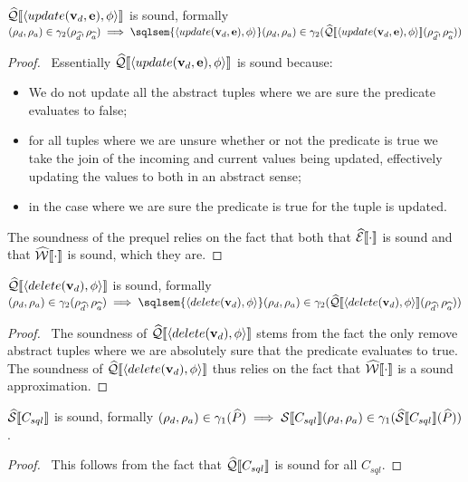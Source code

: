 \begin{conjecture}\label{thm:sound-update}
    $\widehat{\mathcal{Q}}\llbracket \langle update(\mathbf{v}_d, \mathbf{e}), \phi \rangle \rrbracket$ is sound, formally $(\rho_d, \rho_a) \in \concrete_2(\rho_{\ab{d}}, \rho_{\ab{a}}) \implies \sqlsem{\langle update(\absattrs, \absexps), \abspred \rangle}(\rho_d, \rho_a) \in \concrete_2(\abssqlsem{\langle update(\absattrs, \absexps), \abspred \rangle}(\rho_{\ab{d}}, \rho_{\ab{a}}))$
\end{conjecture}
\begin{proof}
    \pfsketch\
    Essentially $\widehat{\mathcal{Q}}\llbracket \langle update(\mathbf{v}_d, \mathbf{e}), \phi \rangle \rrbracket$ is sound because:
    \begin{itemize}
        \item We do not update all the abstract tuples where we are sure the predicate evaluates to false;
        \item for all tuples where we are unsure whether or not the predicate is true we take the join of the incoming and current values being updated, effectively updating the values to both in an abstract sense;
        \item in the case where we are sure the predicate is true for the tuple is updated.
    \end{itemize}
    The soundness of the prequel relies on the fact that both that $\widehat{\mathcal{E}}\llbracket \cdot \rrbracket$ is sound and that $\widehat{\mathcal{W}}\llbracket \cdot \rrbracket$ is sound, which they are.
\end{proof}

\begin{conjecture}\label{thm:sound-update}
    $\widehat{\mathcal{Q}}\llbracket \langle delete(\mathbf{v}_d), \phi \rangle \rrbracket$ is sound, formally $(\rho_d, \rho_a) \in \concrete_2(\rho_{\ab{d}}, \rho_{\ab{a}}) \implies \sqlsem{\langle delete(\absattrs), \abspred \rangle}(\rho_d, \rho_a) \in \concrete_2(\abssqlsem{\langle delete(\absattrs), \abspred \rangle}(\rho_{\ab{d}}, \rho_{\ab{a}}))$
\end{conjecture}
\begin{proof}
    \pfsketch\
    The soundness of $\widehat{\mathcal{Q}}\llbracket \langle delete(\mathbf{v}_d), \phi \rangle \rrbracket$ stems from the fact the only remove abstract tuples where we are absolutely sure that the predicate evaluates to true.
    The soundness of $\widehat{\mathcal{Q}}\llbracket \langle delete(\mathbf{v}_d), \phi \rangle \rrbracket$ thus relies on the fact that $\widehat{\mathcal{W}}\llbracket \cdot \rrbracket$ is a sound approximation.
\end{proof}

\begin{conjecture}\label{thm:sound-sql}
    $\widehat{\mathcal{S}} \llbracket C_{sql} \rrbracket$ is sound, formally $(\rho_d, \rho_a) \in \gamma_1(\widehat{P}) \implies \mathcal{S} \llbracket C_{sql} \rrbracket(\rho_d, \rho_a) \in \gamma_1(\widehat{\mathcal{S}} \llbracket C_{sql} \rrbracket(\widehat{P}))$.
\end{conjecture}
\begin{proof}
    \pf\
    This follows from the fact that $\widehat{\mathcal{Q}}\llbracket C_{sql} \rrbracket$ is sound for all $C_{sql}$.
\end{proof}

